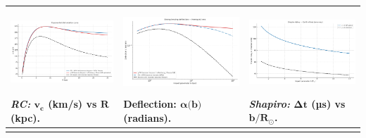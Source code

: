 \documentclass[
]{article}
\begin{document}
\begin{longtable}[]{@{}
  >{\raggedright\arraybackslash}p{}
  >{\raggedright\arraybackslash}p{}
  >{\raggedright\arraybackslash}p{}@{}}
\toprule\noalign{}
\begin{minipage}[b]{\linewidth}\centering
\includegraphics[width=2.10832in,height=1.26417in,alt={image}]{teaser_media/media/image1.png}\emph{RC:}
\(\mathbf{v}_{\mathbf{c}}\) (km/s) vs \(\mathbf{R}\) (kpc).
\end{minipage} & \begin{minipage}[b]{\linewidth}\centering
\includegraphics[width=2.10189in,height=1.26031in,alt={image}]{teaser_media/media/image2.png}Deflection:
\(\mathbf{\alpha}\mathbf{(}\mathbf{b}\mathbf{)}\) (radians).
\end{minipage} & \begin{minipage}[b]{\linewidth}\centering
\includegraphics[width=2.0885in,height=1.25228in,alt={image}]{teaser_media/media/image3.png}\emph{Shapiro:}
\(\mathbf{\Delta}\mathbf{t}\) (µs) vs
\(\mathbf{b}\mathbf{/}\mathbf{R}_{\mathbf{\odot}}\).
\end{minipage} \\
\midrule\noalign{}
\endhead
\bottomrule\noalign{}
\endlastfoot
\end{longtable}
\end{document}
